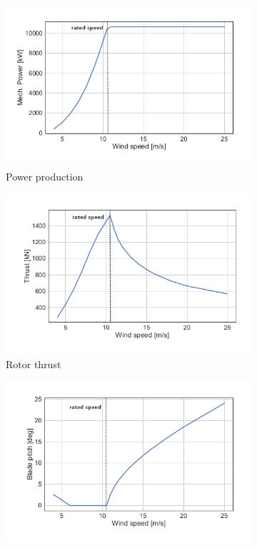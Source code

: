 \begin{figure}
  \centering
  \begin{subfigure}[b]{0.32\textwidth}
      \centering
      \includegraphics[width=\textwidth]{images/IEA10MW-Characteristics-1.png}
      \caption{Power production}
      \label{fig:IEA10MW-power}
  \end{subfigure}
  \begin{subfigure}[b]{0.32\textwidth}
      \centering
      \includegraphics[width=\textwidth]{images/IEA10MW-Characteristics-2.png}
      \caption{Rotor thrust}
      \label{fig:IEA10MW-thrust}
  \end{subfigure}
  \begin{subfigure}[b]{0.32\textwidth}
    \centering
    \includegraphics[width=\textwidth]{images/IEA10MW-Characteristics-3.png}

\end{subfigure}
\end{figure}
